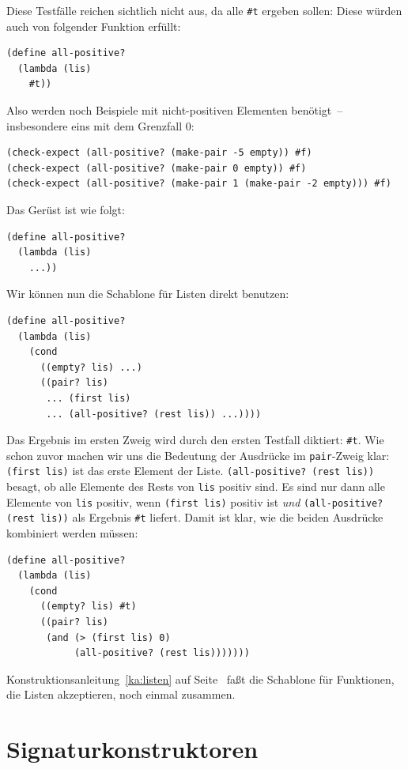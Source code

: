 Diese Testfälle reichen sichtlich nicht aus, da alle \verb|#t| ergeben
sollen: Diese würden auch von folgender Funktion erfüllt:
%
\begin{verbatim}
(define all-positive?
  (lambda (lis)
    #t))
\end{verbatim}
%
Also werden noch Beispiele mit nicht-positiven Elementen benötigt~--
insbesondere eins mit dem Grenzfall $0$:
\begin{verbatim}
(check-expect (all-positive? (make-pair -5 empty)) #f)
(check-expect (all-positive? (make-pair 0 empty)) #f)
(check-expect (all-positive? (make-pair 1 (make-pair -2 empty))) #f)
\end{verbatim}
%
Das Gerüst ist wie folgt:
%
\begin{verbatim}
(define all-positive?
  (lambda (lis)
    ...))
\end{verbatim}
%
Wir können nun die Schablone für Listen direkt benutzen:
%
\begin{verbatim}
(define all-positive?
  (lambda (lis)
    (cond
      ((empty? lis) ...)
      ((pair? lis)
       ... (first lis)
       ... (all-positive? (rest lis)) ...))))
\end{verbatim}
%
Das Ergebnis im ersten Zweig wird durch den ersten Testfall diktiert:
\verb|#t|.  Wie schon zuvor machen wir uns die Bedeutung der
Ausdrücke im \texttt{pair}-Zweig klar:
\texttt{(first lis)} ist das erste Element der Liste.
\texttt{(all-positive? (rest lis))} besagt, ob alle Elemente
des Rests von \texttt{lis} positiv sind.  Es sind nur dann alle
Elemente von \texttt{lis} positiv, wenn \texttt{(first lis)}
positiv ist \emph{und} \texttt{(all-positive? (rest lis))} als Ergebnis
\verb|#t| liefert.  Damit ist klar, wie die beiden Ausdrücke
kombiniert werden müssen:
%
\begin{verbatim}
(define all-positive?
  (lambda (lis)
    (cond
      ((empty? lis) #t)
      ((pair? lis)
       (and (> (first lis) 0)
            (all-positive? (rest lis)))))))
\end{verbatim}
%
Konstruktionsanleitung~\ref{ka:listen} auf Seite~\pageref{ka:listen}
faßt die Schablone für Funktionen, die Listen akzeptieren, noch einmal
zusammen.

\section{Signaturkonstruktoren}

